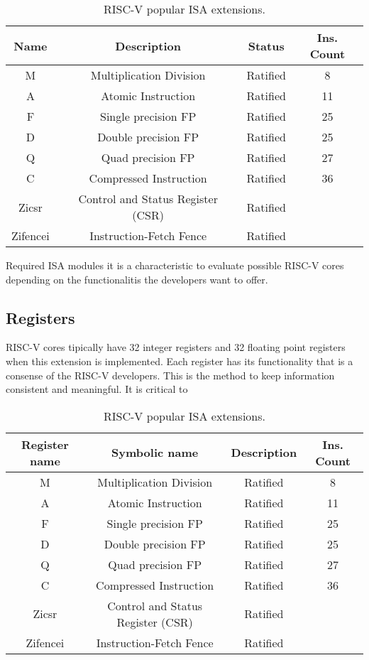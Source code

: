 \begin{table}[H]
\centering
\begin{tabular}{|c|c|c|c|}
\hline
\textbf{Name} & \textbf{Description} & \textbf{Status}  & \textbf{Ins. Count}  \\ \hline

M & Multiplication Division & Ratified & 8\\ \hline
A & Atomic Instruction & Ratified & 11 \\ \hline
F & Single precision FP & Ratified & 25 \\ \hline
D & Double precision FP & Ratified & 25 \\ \hline
Q & Quad precision FP & Ratified & 27 \\ \hline
C & Compressed Instruction & Ratified & 36 \\ \hline
Zicsr & Control and Status Register (CSR) & Ratified &  \\ \hline
Zifencei & Instruction-Fetch Fence & Ratified & \\ \hline
\end{tabular}
\caption{RISC-V popular ISA extensions.} 
\end{table}

Required ISA modules it is a characteristic to evaluate possible RISC-V cores depending on the functionalitis the developers want to offer. 

\subsection{Registers}
RISC-V cores tipically have 32 integer registers and 32 floating point registers when this extension is implemented. Each register has its functionality that is a consense of the RISC-V developers. This is the method to keep information consistent and meaningful. It is critical to 


\begin{table}[H]
\centering
\begin{tabular}{|c|c|c|c|}
\hline
\textbf{Register name} & \textbf{Symbolic name} & \textbf{Description}  & \textbf{Ins. Count}  \\ \hline

M & Multiplication Division & Ratified & 8\\ \hline
A & Atomic Instruction & Ratified & 11 \\ \hline
F & Single precision FP & Ratified & 25 \\ \hline
D & Double precision FP & Ratified & 25 \\ \hline
Q & Quad precision FP & Ratified & 27 \\ \hline
C & Compressed Instruction & Ratified & 36 \\ \hline
Zicsr & Control and Status Register (CSR) & Ratified &  \\ \hline
Zifencei & Instruction-Fetch Fence & Ratified & \\ \hline
\end{tabular}
\caption{RISC-V popular ISA extensions.} 
\end{table}



